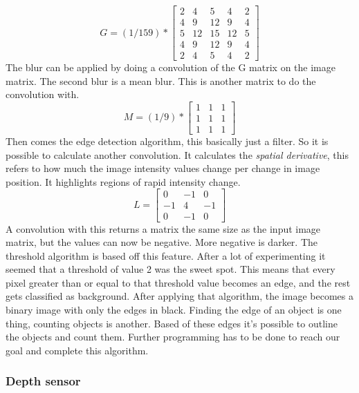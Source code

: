 \documentclass[11pt]{article}
\begin{document}
\begin{equation}
  G = (1/159) * 
  \begin{bmatrix}
   2 & 4 & 5 & 4 & 2\\
   4 & 9 & 12 & 9 & 4\\
   5 & 12 & 15 & 12 & 5\\
   4 & 9 & 12 & 9& 4\\
   2 & 4 & 5 & 4 & 2
  \end{bmatrix}
\end{equation}
The blur can be applied by doing a convolution of the G matrix on the image matrix.
The second blur is a mean blur. This is another matrix to do the convolution with.
\begin{equation}
M = (1/9) * 
\begin{bmatrix}
	1&1&1\\
	1&1&1\\
	1&1&1
\end{bmatrix}
\end{equation}
Then comes the edge detection algorithm, this basically just a filter. So it is possible to calculate another convolution. It calculates the \textit{spatial  derivative}, this refers to how much the image intensity values change per change in image position. It highlights regions of rapid intensity change.
\begin{equation}
L =\begin{bmatrix}
	0&-1&0\\
	-1&4&-1\\
	0&-1&0
\end{bmatrix}
\end{equation}
A convolution with this returns a matrix the same size as the input image matrix, but the values can now be negative. More negative is darker. The threshold algorithm is based off this feature. After a lot of experimenting it seemed that a threshold of value 2 was the sweet spot. This means that every pixel greater than or equal to that threshold value becomes an edge, and the rest gets classified as background. After applying that algorithm, the image becomes a binary image with only the edges in black. Finding the edge of an object is one thing, counting objects is another. Based of these edges it's possible to outline the objects and count them. Further programming has to be done to reach our goal and complete this algorithm.



\subsubsection{Depth sensor}
\end{document}
